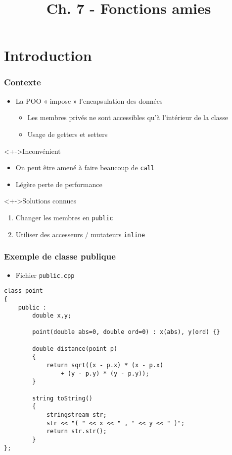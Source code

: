 


\title{Ch. 7 - Fonctions amies}




\section{Introduction}

\begin{frame}
\frametitle{Contexte}
\begin{itemize}[<+->]
\item La POO « impose » l'encapsulation des données
	\begin{itemize}
	\item Les membres privés ne sont accessibles qu'à l'intérieur de la classe
	\item Usage de getters et setters
	\end{itemize}
\end{itemize}
\begin{alertblock}<+->{Inconvénient}
	\begin{itemize}[<+->]
	\item On peut être amené à faire beaucoup de \texttt{call}
	\item Légère perte de performance
	\end{itemize}
\end{alertblock}
\begin{exampleblock}<+->{Solutions connues}
	\begin{enumerate}[<+->]
	\item Changer les membres en \lstinline|public|
	\item Utiliser des accesseurs / mutateurs \lstinline|inline|
	\end{enumerate}
\end{exampleblock}
\end{frame}

\begin{frame}[containsverbatim]
\frametitle{Exemple de classe publique}
\begin{itemize}
\item Fichier \texttt{public.cpp}
\end{itemize}
\begin{lstlisting}
class point
{	
	public :
		double x,y;

		point(double abs=0, double ord=0) : x(abs), y(ord) {}

		double distance(point p)
		{
			return sqrt((x - p.x) * (x - p.x) 
				+ (y - p.y) * (y - p.y));
		}

		string toString()
		{
			stringstream str;
			str << "( " << x << " , " << y << " )";		
			return str.str();
		}
};
\end{lstlisting}
\end{frame}

